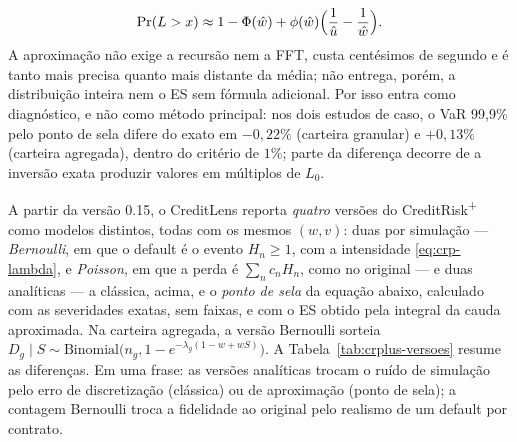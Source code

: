 \documentclass[11pt,a4paper]{article}
\begin{document}
\begin{equation}
\Pr(L>x)\approx 1-\Phi(\hat w)+\phi(\hat w)\Bigl(\frac{1}{\hat u}-\frac{1}{\hat w}\Bigr).
\end{equation}
A aproximação não exige a recursão nem a FFT, custa centésimos de segundo e é tanto mais precisa quanto mais distante da média; não entrega, porém, a distribuição inteira nem o ES sem fórmula adicional. Por isso entra como diagnóstico, e não como método principal: nos dois estudos de caso, o VaR 99{,}9\% pelo ponto de sela difere do exato em $-0{,}22\%$ (carteira granular) e $+0{,}13\%$ (carteira agregada), dentro do critério de $1\%$; parte da diferença decorre de a inversão exata produzir valores em múltiplos de $L_0$.

A partir da versão 0.15, o CreditLens reporta \emph{quatro} versões do CreditRisk\textsuperscript{+} como modelos distintos, todas com os mesmos $(w,v)$: duas por simulação --- \emph{Bernoulli}, em que o default é o evento $H_n\ge1$, com a intensidade \eqref{eq:crp-lambda}, e \emph{Poisson}, em que a perda é $\sum_n c_nH_n$, como no original --- e duas analíticas --- a clássica, acima, e o \emph{ponto de sela} da equação abaixo, calculado com as severidades exatas, sem faixas, e com o ES obtido pela integral da cauda aproximada. Na carteira agregada, a versão Bernoulli sorteia $D_g\mid S\sim\mathrm{Binomial}\bigl(n_g,1-e^{-\lambda_g(1-w+wS)}\bigr)$. A Tabela~\ref{tab:crplus-versoes} resume as diferenças. Em uma frase: as versões analíticas trocam o ruído de simulação pelo erro de discretização (clássica) ou de aproximação (ponto de sela); a contagem Bernoulli troca a fidelidade ao original pelo realismo de um default por contrato.
\end{document}
